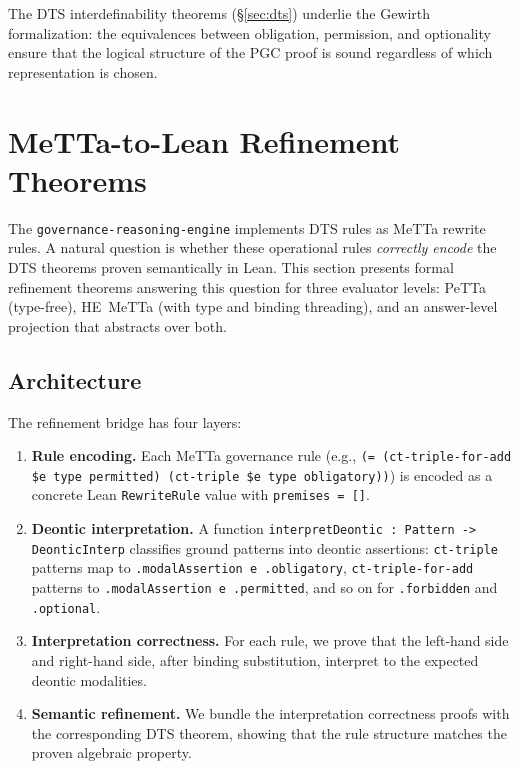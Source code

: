 \documentclass[]{article}
\newcommand{\code}[1]{\texttt{#1}}
\newcommand{\DTS}{\textup{DTS}}
\begin{document}
\noindent
The \DTS{} interdefinability theorems (§\ref{sec:dts}) underlie the Gewirth
formalization: the equivalences between obligation, permission, and optionality
ensure that the logical structure of the PGC proof is sound regardless of which
representation is chosen.

\section{MeTTa-to-Lean Refinement Theorems}
\label{sec:refinement}

The \code{governance-reasoning-engine} \cite{GovReasoningEngine} implements
\DTS{} rules as MeTTa rewrite rules.  A natural question is whether these
operational rules \emph{correctly encode} the \DTS{} theorems proven
semantically in Lean.  This section presents formal refinement theorems
answering this question for three evaluator levels: PeTTa (type-free),
HE~MeTTa (with type and binding threading), and an answer-level projection
that abstracts over both.

\subsection{Architecture}

The refinement bridge has four layers:

\begin{enumerate}
\item \textbf{Rule encoding.} Each MeTTa governance rule (e.g.,
      \code{(= (ct-triple-for-add \$e type permitted) (ct-triple \$e type obligatory))})
      is encoded as a concrete Lean \code{RewriteRule} value with
      \code{premises = []}.
\item \textbf{Deontic interpretation.} A function
      \code{interpretDeontic : Pattern -> DeonticInterp}
      classifies ground patterns into deontic assertions:
      \code{ct-triple} patterns map to \code{.modalAssertion e .obligatory},
      \code{ct-triple-for-add} patterns to \code{.modalAssertion e .permitted},
      and so on for \code{.forbidden} and \code{.optional}.
\item \textbf{Interpretation correctness.} For each rule, we prove that
      the left-hand side and right-hand side, after binding substitution,
      interpret to the expected deontic modalities.
\item \textbf{Semantic refinement.} We bundle the interpretation correctness
      proofs with the corresponding \DTS{} theorem, showing that the rule
      structure matches the proven algebraic property.
\end{enumerate}
\end{document}
